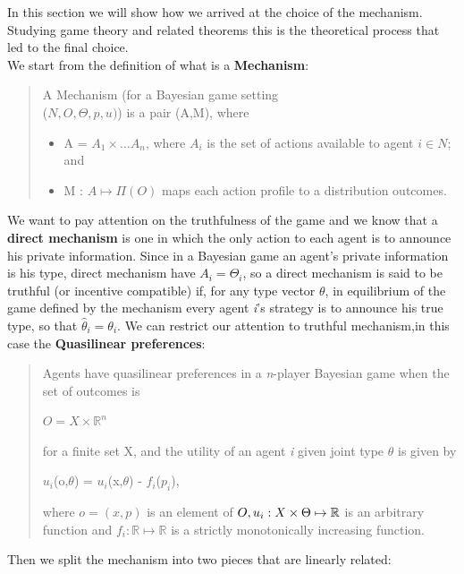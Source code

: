 \documentclass{article}
\begin{document}
\Large{
In this section we will show how we arrived at the choice of the mechanism. Studying game theory and related theorems this is the theoretical process that led to the final choice.\\
We start from the definition of what is a \textbf{Mechanism}:
\begin{quote}
    A Mechanism (for a Bayesian game setting\\ ($N,O,\Theta,p,u)$) is a pair (A,M), where
    \begin{itemize}
        \item A = $A_1 \times \dots A_n$, where $A_i$ is the set of actions available to agent $i \in N$; and
        \item M : $A \mapsto \Pi(O)$ maps each action profile to a distribution outcomes.
    \end{itemize}
\end{quote}
We want to pay attention on the truthfulness of the game and we know that a \textbf{direct mechanism} is one in which the only action to each agent is to announce his private information. Since in a Bayesian game an agent's private information is his type, direct mechanism have $A_i = \Theta_i$, so a direct mechanism is said to be truthful (or incentive compatible) if, for any type vector $\theta$, in equilibrium of the game defined by the mechanism every agent \textit{i}'s strategy is to announce his true type, so that $\hat{\theta}_i = \theta_i$. We can restrict our attention to truthful mechanism,\newpage in this case the \textbf{Quasilinear preferences}:
\begin{quote}
    Agents have quasilinear preferences in a \textit{n}-player Bayesian game when the set of outcomes is
    \begin{center}
        $O = X \times \mathbb{R}^n$
    \end{center}
    for a finite set X, and the utility of an agent \textit{i} given joint type $\theta$ is given by
    \begin{center}
        $u_i$(o,$\theta$) = $u_i$(x,$\theta$) - $f_i$($p_i$),
    \end{center}
    where $o = (x,p)$ is an element of $O,\\ u_i : X \times \Theta \mapsto \mathbb{R}$ is an arbitrary function  and $f_i : \mathbb{R} \mapsto \mathbb{R}$ is a strictly monotonically increasing function.
\end{quote}
Then we split the mechanism into two pieces that are linearly related:
\begin{center}

\end{center}}
\end{document}
